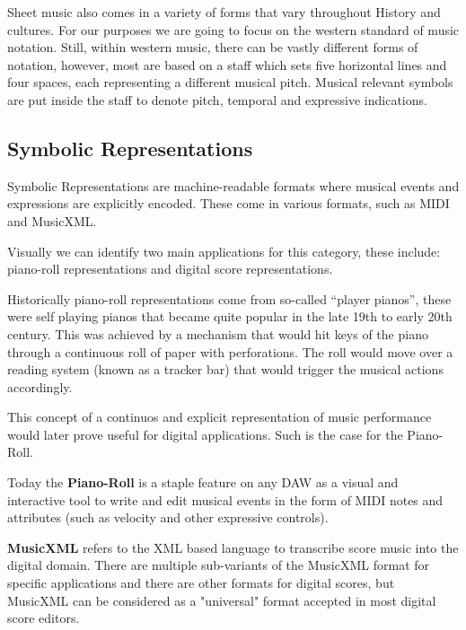Sheet music also comes in a variety of forms that vary throughout History and cultures. For our purposes we are going to focus on the western standard of music notation. Still, within western music, there can be vastly different forms of notation, however, most are based on a staff which sets five horizontal lines and four spaces, each representing a different musical pitch. Musical relevant symbols are put inside the staff to denote pitch, temporal and expressive indications. \cite{mullerFundamentalsMusicProcessing2015}

\subsection{Symbolic Representations}

Symbolic Representations are machine-readable formats where musical events and expressions are explicitly encoded. These come in various formats, such as \ac{MIDI} and MusicXML.

Visually we can identify two main applications for this category, these include: piano-roll representations and digital score representations. 

Historically piano-roll representations come from so-called ``player pianos'', these were self playing pianos that became quite popular in the late 19th to early 20th century. This was achieved by a mechanism that would hit keys of the piano through a continuous roll of paper with perforations. The roll would move over a reading system (known as a tracker bar) that would  trigger the musical actions accordingly. 

This concept of a continuos and explicit representation of music performance would later prove useful for digital applications. Such is the case for the Piano-Roll.

Today the \textbf{Piano-Roll} is a staple feature on any \ac{DAW} as a visual and interactive tool to write and edit musical events in the form of \ac{MIDI} notes and attributes (such as velocity and other expressive controls).

\textbf{MusicXML} refers to the \ac{XML} based language to transcribe score music into the digital domain. There are multiple sub-variants of the MusicXML format for specific applications and there are other formats for digital scores, but MusicXML can be considered as a "universal" format accepted in most digital score editors. 


